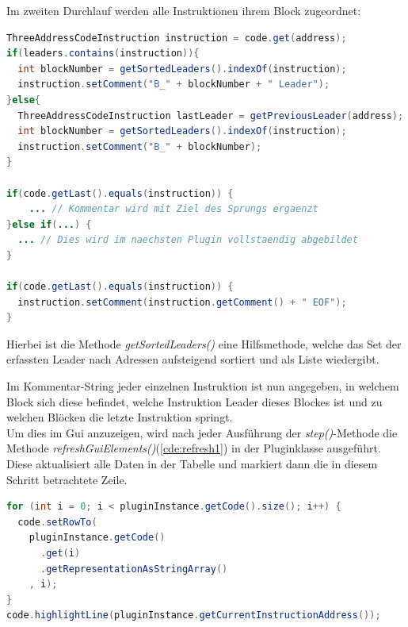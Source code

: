 Im zweiten Durchlauf werden alle Instruktionen ihrem Block zugeordnet:
\begin{lstlisting}[language=Java, caption={Zuordnen der Instruktionen zu ihren Blöcken}, label={cde:mapBlocks}]
ThreeAddressCodeInstruction instruction = code.get(address);
if(leaders.contains(instruction)){
  int blockNumber = getSortedLeaders().indexOf(instruction);
  instruction.setComment("B_" + blockNumber + " Leader");
}else{
  ThreeAddressCodeInstruction lastLeader = getPreviousLeader(address);
  int blockNumber = getSortedLeaders().indexOf(instruction);
  instruction.setComment("B_" + blockNumber);
}

if(code.getLast().equals(instruction)) {
    ... // Kommentar wird mit Ziel des Sprungs ergaenzt
}else if(...) {
  ... // Dies wird im naechsten Plugin vollstaendig abgebildet
}

if(code.getLast().equals(instruction)) {
  instruction.setComment(instruction.getComment() + " EOF");
}
\end{lstlisting}
Hierbei ist die Methode \textit{getSortedLeaders()} eine Hilfsmethode, welche
das Set der erfassten Leader nach Adressen aufsteigend sortiert und als Liste wiedergibt.

\newpage
Im Kommentar-String jeder einzelnen Instruktion ist nun angegeben, in welchem
Block sich diese befindet, welche Instruktion Leader dieses Blockes ist und
zu welchen Blöcken die letzte Instruktion springt.\\
Um dies im Gui anzuzeigen, wird nach jeder Ausführung der \textit{step()}-Methode
die Methode \textit{refreshGuiElements()}(\cref{cde:refresh1}) in der Pluginklasse ausgeführt.
Diese aktualisiert alle Daten in der Tabelle und markiert dann die in diesem
Schritt betrachtete Zeile.
\begin{lstlisting}[language=Java, caption={Aktualisieren der Tabelle}, label={cde:refresh1}]
for (int i = 0; i < pluginInstance.getCode().size(); i++) {
  code.setRowTo(
    pluginInstance.getCode()
      .get(i)
      .getRepresentationAsStringArray()
    , i);
}
code.highlightLine(pluginInstance.getCurrentInstructionAddress());
\end{lstlisting}





\newpage
